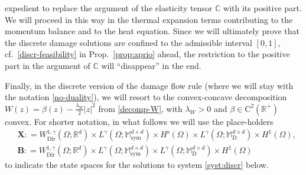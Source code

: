 \documentclass[a4paper,10pt,reqno]{amsart}
\numberwithin{equation}{section}
\newcommand{\bbM}{\mathbb{M}}
\newcommand{\R}{\mathbb{R}}
\numberwithin{equation}{section}
\newcommand{\Dir}{\mathrm{Dir}}
\newcommand{\bbC}{\mathbb{C}}
\newcommand{\mt}{\bbM}
\newcommand{\sym}{\mathrm{sym}}
\newcommand{\dev}{\mathrm{D}}
\newcommand{\spz}{H^{\mathrm{s}}(\Omega)}
\newcommand{\bsp}{\mathbf{X}}
\newcommand{\rbsp}{\mathbf{B}}
\begin{document}
expedient to  replace the argument of 
  the elasticity tensor $\bbC$ with its positive part. We will proceed in this way in the thermal expansion terms  contributing to the momentum balance and to the heat equation. 
%  
Since we will ultimately prove that the discrete damage solutions are confined to the admissible interval $[0,1]$, 
cf.\ \eqref{discr-feasibility} in Prop.\ \ref{prop:aprio} ahead,  the restriction to the positive part in the argument of  $\bbC$ will ``disappear'' in the end. 
\par
Finally, in the discrete version of  the damage flow rule 
(where  we will stay with the notation \eqref{no-duality}), 
we will resort to the convex-concave decomposition $W (z)=\beta(z)- \tfrac{\lambda_W}2  |z|^2$ from \eqref{decomp-W}, 
 with  $\lambda_W>0$ and $\beta\in \mathrm{C}^2(\R^+)$  convex. 
 For shorter notation, in what follows  we will use the place-holders
 \[
 \begin{aligned}
 &
 \bsp: =  W_\Dir^{1,\gamma} (\Omega;\R^d)  \times L^\gamma (\Omega;\mt_\sym^{d\times d}) \times \spz\times 
L^\gamma (\Omega;\mt_\dev^{d\times d}) \times H^1(\Omega),
\\
&
 \rbsp : = W_\Dir^{1,\gamma} (\Omega;\R^d)  \times L^\gamma (\Omega;\mt_\sym^{d\times d}) \times 
L^\gamma (\Omega;\mt_\dev^{d\times d}) \times H^1(\Omega)
\end{aligned}
 \]
 to indicate the state spaces for the solutions to system \eqref{syst:discr} below.
\end{document}

